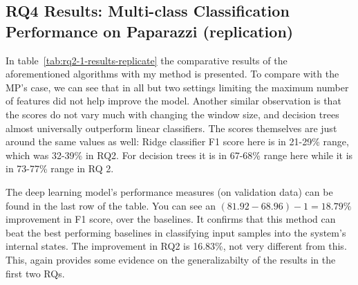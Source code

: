 \subsection{RQ4 Results: Multi-class Classification Performance on Paparazzi (replication)}
In table~\ref{tab:rq2-1-results-replicate} the comparative results of the aforementioned algorithms with my method is presented. 
To compare with the MP's case, we can see that in all but two settings limiting the maximum number of features did not help improve the model. 
Another similar observation is that the scores do not vary much with changing the window size, and decision trees almost universally outperform linear classifiers.
The scores themselves are just around the same values as well: Ridge classifier F1 score here is in 21-29\% range, which was 32-39\% in RQ2. For decision trees it is in 67-68\% range here while it is in 73-77\% range in RQ 2. 

The deep learning model's performance measures (on validation data) can be found in the last row of the table. 
You can see an $(81.92-68.96)-1=18.79\%$ improvement in F1 score, over the baselines. It confirms that this method can beat the best performing baselines in classifying input samples into the system's internal states. The improvement in RQ2 is 16.83\%, not very different from this. This, again provides some evidence on the generalizabilty of the results in the first two RQs.

